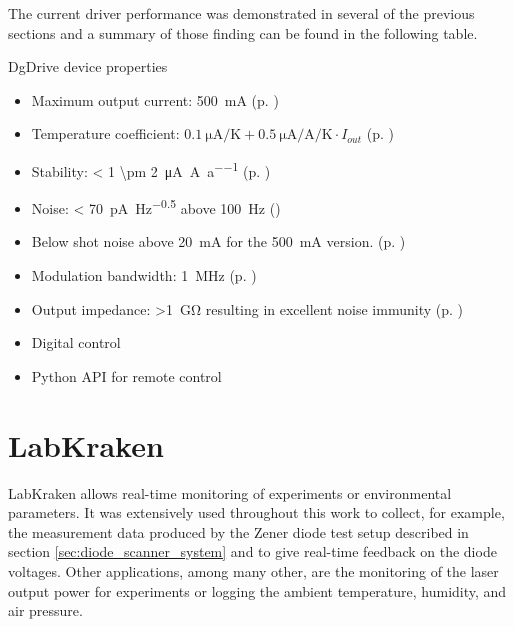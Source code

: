 The current driver performance was demonstrated in several of the previous sections and a summary of those finding can be found in the following table.
\begin{center}
    \begin{deviceProperties}[label={lst:dgDrive_summary}]{DgDrive device properties}
    \begin{itemize}
        \item Maximum output current: \qty{500}{\mA} (p. \pageref{tab:dgDrive_configurations})
        \item Temperature coefficient: $\qty{0.1}{\uA \per \K} + \qty{0.5}{\uA \per \A \per \K} \cdot I_{out}$ (p. \pageref{fig:dgDrive_tempco_50mA})
        \item Stability: \qty{< 1 \pm 2}{\uA \per \A \per a} (p. \pageref{fig:stability_dgDrive})
        \item Noise: \qty{< 70}{\pA \per \Hz\tothe{0.5}} above \qty{100}{\Hz} (\pageref{fig:laser_driver_noise_measurement})
        \item Below shot noise above \qty{20}{\mA} for the \qty{500}{\mA} version. (p. \pageref{fig:laser_driver_noise_hmp4040})
        \item Modulation bandwidth: \qty{1}{\MHz} (p. \pageref{fig:dgDrive_modulation_amplitude})
        \item Output impedance: \qty{>1}{\giga\ohm} resulting in excellent noise immunity (p. \pageref{fig:dgDrive_output_impedance_comparison})
        \item Digital control
        \item Python API for remote control
    \end{itemize}
    \end{deviceProperties}
\end{center}



\clearpage
\section{LabKraken}%
\label{sec:res_labkraken}%
LabKraken allows real-time monitoring of experiments or environmental parameters. It was extensively used throughout this work to collect, for example, the measurement data produced by the Zener diode test setup described in section \ref{sec:diode_scanner_system} and to give real-time feedback on the diode voltages. Other applications, among many other, are the monitoring of the laser output power for experiments or logging the ambient temperature, humidity, and air pressure.

